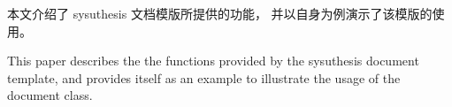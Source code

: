 %

\begin{cabstract}

	本文介绍了 sysuthesis 文档模版所提供的功能，
	并以自身为例演示了该模版的使用。

\end{cabstract}

\begin{eabstract}

	This paper describes the the functions provided by
	the sysuthesis document template,
	and provides itself as an example to illustrate
	the usage of the document class.

\end{eabstract}

